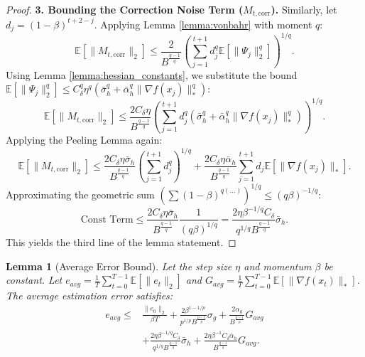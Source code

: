 \documentclass{article}
\theoremstyle{plain}
\newtheorem{lemma}[theorem]{Lemma}
\theoremstyle{definition}
\theoremstyle{remark}
\begin{document}
\begin{proof}
\textbf{3. Bounding the Correction Noise Term ($M_{t, \text{corr}}$).}
Similarly, let $d_j = (1-\beta)^{t+2-j}$. Applying Lemma \ref{lemma:vonbahr} with moment $q$:
$$ \mathbb{E}[\|M_{t, \text{corr}}\|_2] \le \frac{2}{B^{\frac{q-1}{q}}} \left( \sum_{j=1}^{t+1} d_j^q \mathbb{E}[\|\Psi_j\|_2^q] \right)^{1/q}. $$
Using Lemma \ref{lemma:hessian_constants}, we substitute the bound $\mathbb{E}[\|\Psi_j\|_2^q] \le C_\delta^q \eta^q (\bar{\sigma}_h^q + \bar{\alpha}_h^q \|\nabla f(x_j)\|_*^q)$:
$$ \mathbb{E}[\|M_{t, \text{corr}}\|_2] \le \frac{2 C_\delta \eta}{B^{\frac{q-1}{q}}} \left( \sum_{j=1}^{t+1} d_j^q (\bar{\sigma}_h^q + \bar{\alpha}_h^q \|\nabla f(x_j)\|_*^q) \right)^{1/q}. $$
Applying the Peeling Lemma again:
$$ \mathbb{E}[\|M_{t, \text{corr}}\|_2] \le \frac{2 C_\delta \eta \bar{\sigma}_h}{B^{\frac{q-1}{q}}} \left( \sum_{j=1}^{t+1} d_j^q \right)^{1/q} + \frac{2 C_\delta \eta \bar{\alpha}_h}{B^{\frac{q-1}{q}}} \sum_{j=1}^{t+1} d_j \mathbb{E}[\|\nabla f(x_j)\|_*]. $$
Approximating the geometric sum $\left(\sum (1-\beta)^{q(\dots)}\right)^{1/q} \le (q\beta)^{-1/q}$:
$$ \text{Const Term} \le \frac{2 C_\delta \eta \bar{\sigma}_h}{B^{\frac{q-1}{q}}} \frac{1}{(q\beta)^{1/q}} = \frac{2 \eta \beta^{-1/q} C_\delta}{q^{1/q} B^{\frac{q-1}{q}}} \bar{\sigma}_h. $$
This yields the third line of the lemma statement.
\end{proof}

\begin{lemma}[Average Error Bound]
\label{lemma:avg_error}
Let the step size $\eta$ and momentum $\beta$ be constant. Let $e_{avg} = \frac{1}{T} \sum_{t=0}^{T-1} \mathbb{E}[\|e_t\|_2]$ and $G_{avg} = \frac{1}{T} \sum_{t=0}^{T-1} \mathbb{E}[\|\nabla f(x_t)\|_*]$. The average estimation error satisfies:
\begin{align}
    e_{avg} \le & \frac{\|e_0\|_2}{\beta T} 
    + \frac{2 \beta^{1 - 1/p}}{p^{1/p} B^{\frac{p-1}{p}}} \sigma_g 
    + \frac{2 \alpha_g}{B^{\frac{p-1}{p}}} G_{avg} \nonumber \\
    & + \frac{2 \eta \beta^{-1/q} C_\delta}{q^{1/q} B^{\frac{q-1}{q}}} \bar{\sigma}_h
    + \frac{2 \eta \beta^{-1} C_\delta \bar{\alpha}_h}{B^{\frac{q-1}{q}}} G_{avg}.
\end{align}
\end{lemma}
\end{document}
